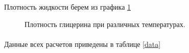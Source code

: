 \documentclass[a4paper, 12pt]{article}
\begin{document}
Плотность жидкости берем из графика \ref{density} \begin{figure}[h]
 \caption{Плотность
глицерина при различных температурах.} \label{density} \end{figure} \paragraph{}
Данные всех расчетов приведены в таблице \ref{data}
\end{document}
